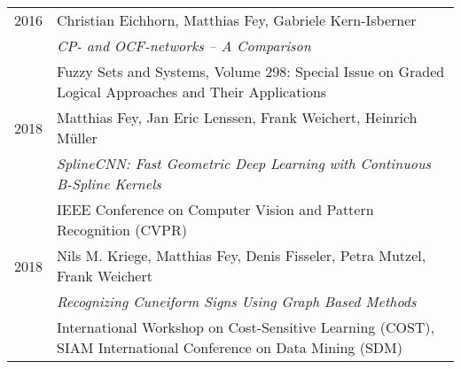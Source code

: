 \documentclass[letterpaper,11pt]{article}
\begin{document}
\begin{tabular}{p{3cm}p{13cm}}
2016 & Christian Eichhorn, Matthias Fey, Gabriele Kern-Isberner\\
     & \textit{CP- and OCF-networks – A Comparison}\\
     & Fuzzy Sets and Systems, Volume 298: Special Issue on Graded Logical Approaches and Their Applications\\
2018 & Matthias Fey, Jan Eric Lenssen, Frank Weichert, Heinrich Müller\\
     & \textit{SplineCNN: Fast Geometric Deep Learning with Continuous B-Spline Kernels}\\
     & IEEE Conference on Computer Vision and Pattern Recognition (CVPR)\\
2018 & Nils M. Kriege, Matthias Fey, Denis Fisseler, Petra Mutzel, Frank Weichert\\
     & \textit{Recognizing Cuneiform Signs Using Graph Based Methods}\\
     & International Workshop on Cost-Sensitive Learning (COST), SIAM International Conference on Data Mining (SDM)\\
\end{tabular}






\end{document}
